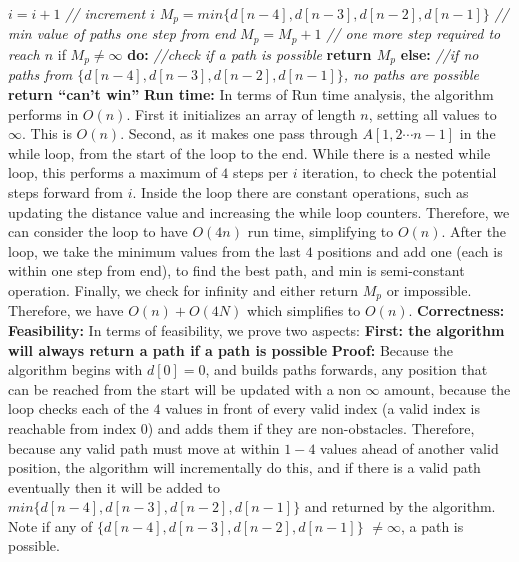 \documentclass{article}
\begin{document}
\indent $i=i+1$ \textit{ // increment $i$}\newline 
$M_p=min\{d[n-4],d[n-3],d[n-2],d[n-1]\}$ \textit{ // min value of paths one step from end} \newline
$M_p=M_p+1$ \textit{// one more step required to reach $n$} \newline
if $M_p \neq \infty$ \textbf{do:} \textit{//check if a path is possible} \newline 
\indent \textbf{return $M_p$} \newline 
\textbf{else:} \textit{//if no paths from $\{d[n-4],d[n-3],d[n-2],d[n-1]\}$, no paths are possible} \newline 
\indent \textbf{return “can’t win”} \newline\newline
\textbf{Run time:} In terms of Run time analysis, the algorithm performs in $O(n)$. First it initializes an array of length $n$, setting all values to $\infty$. This is $O(n)$. Second, as it makes one pass through $A[1, 2 \cdots n-1 ]$ in the while loop, from the start of the loop to the end. While there is a nested while loop, this performs a maximum of $4$ steps per $i$ iteration, to check the potential steps forward from $i$. Inside the loop there are constant operations, such as updating the distance value and increasing the while loop counters. Therefore, we can consider the loop to have $O(4n)$ run time, simplifying to $O(n)$. After the loop, we take the minimum values from the last $4$ positions and add one (each is within one step from end), to find the best path, and min is semi-constant operation. Finally, we check for infinity and either return $M_p$ or impossible. Therefore, we have $O(n)+O(4N)$ which simplifies to $O(n)$. \newline\newline
\textbf{Correctness:} \newline
\textbf{Feasibility:} In terms of feasibility, we prove two aspects: \newline
\textbf{First: the algorithm will always return a path if a path is possible} \newline 
\textbf{Proof:} Because the algorithm begins with $d[0]=0$, and builds paths forwards, any position that can be reached from the start will be updated with a non $\infty$ amount, because the loop checks each of the $4$ values in front of every valid index (a valid index is reachable from index $0$) and adds them if they are non-obstacles. Therefore, because any valid path must move at within $1-4$ values ahead of another valid position, the algorithm will incrementally do this, and if there is a valid path eventually then it will be added to $min\{d[n-4],d[n-3],d[n-2],d[n-1]\}$ and returned by the algorithm. Note if any of $\{d[n-4],d[n-3],d[n-2],d[n-1]\}$ $\neq \infty$, a path is possible. \newline
\end{document}
